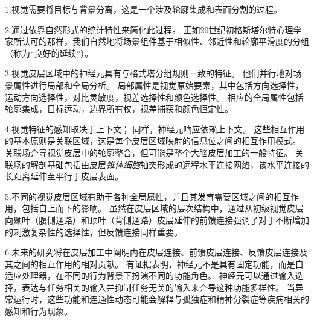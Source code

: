 1.视觉需要将目标与背景分离，这是一个涉及轮廓集成和表面分割的过程。 


2.通过依靠自然形式的统计特性来简化此过程。
正如20世纪初格斯塔尔特心理学家所认可的那样，我们自然地将场景组件基于相似性、邻近性和轮廓平滑度的分组（称为“良好的延续”）。


3.视觉皮层区域中的神经元具有与格式塔分组规则一致的特征。
他们并行地对场景属性进行局部和全局分析。
局部属性是视觉原始要素，其中包括方向选择性，运动方向选择性，对比灵敏度，视差选择性和颜色选择性。
相应的全局属性包括轮廓集成，目标运动，边界所有权，视差捕获和颜色恒定性。


4.视觉特征的感知取决于上下文；
同样，神经元响应依赖上下文。
这些相互作用的基本原则是关联区域，这是每个皮层区域映射的信息位之间的相互作用模式。
关联场介导视觉皮层中的轮廓整合，但可能是整个大脑皮层加工的一般特征。
关联场的解剖基础包括由皮层\textit{锥体细胞}轴突形成的远程水平连接网络，该水平连接的长距离延伸至平行于皮层表面。


5.不同的视觉皮层区域有助于各种全局属性，并且其发育需要区域之间的相互作用，包括自上而下的影响。
虽然在皮层区域的层次结构中，通过从初级视觉皮层向颞叶（腹侧通路）和顶叶（背侧通路）皮层延伸的前馈连接强调了对于不断增加的刺激复杂性的选择性，但反馈连接同样重要。 


6.未来的研究将在皮层加工中阐明内在皮层连接、前馈皮层连接、反馈皮层连接及其之间的相互作用的相对贡献。
有证据表明，神经元不是具有固定功能，而是自适应处理器，在不同的行为背景下扮演不同的功能角色。
神经元可以通过输入选择，表达与任务相关的输入并抑制任务无关的输入来介导这种功能多样性。
当异常运行时，这些功能和连通性动态可能会解释与孤独症和精神分裂症等疾病相关的感知和行为现象。

